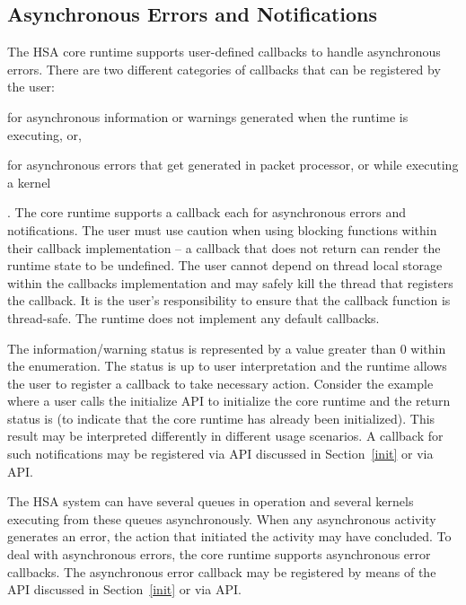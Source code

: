\documentclass[draft]{book}
\newcommand{\mariotodo}[1]{\todo[color=CarnationPink]{#1}}
\begin{document}
\hypertarget{asyncerror}{}\subsection{Asynchronous Errors and
Notifications}\label{asyncerror}

The HSA core runtime supports user-defined callbacks to handle asynchronous
errors. There are two different \mariotodo{why separating them?} categories of
callbacks that can be registered by the user:\begin{inparaenum}[(i)]\item for
  asynchronous information or warnings generated when the runtime is executing,
  or, \item for asynchronous errors that get generated in packet processor, or
  while executing a kernel \end{inparaenum}. The core runtime supports a
callback each for asynchronous errors and notifications. The user must use
caution when using blocking functions within their callback implementation -- a
callback that does not return can render the runtime state to be undefined. The
user cannot depend on thread local storage within the callbacks implementation
and may safely kill the thread that registers the callback. It is the user's
responsibility to ensure that the callback function is thread-safe. The runtime
does not implement any default callbacks.

The information/warning status is represented by a value greater than 0 within
the  enumeration. The status is up to user interpretation
and the runtime allows the user to register a callback to take necessary
action. Consider the example where a user calls the initialize API to initialize
the core runtime and the return status is
 (to indicate that the core
runtime has already been initialized). This result may be interpreted
differently in different usage scenarios. A callback for such notifications may
be registered via  API discussed in Section~\ref{init} or via
 API.

The HSA system can have several queues in operation and several kernels
executing from these queues asynchronously. When any asynchronous activity
generates an error, the action that initiated the activity may have
concluded. To deal with asynchronous errors, the core runtime supports
asynchronous error callbacks. The asynchronous error callback may be registered
by means of the  API discussed in Section~\ref{init} or via
 API.
\end{document}
